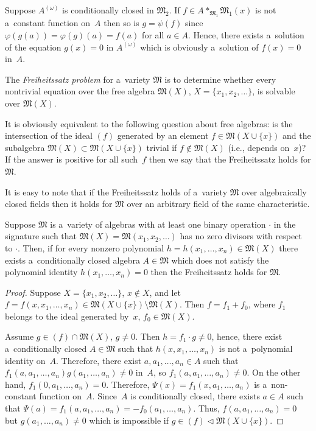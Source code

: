 \documentclass[pdftex]{sigma}
\begin{document}
Suppose $A^{(\omega)}$ is conditionally closed in $\mathfrak M_2$.
If $f \in A*_{\mathfrak M_1} \mathfrak M_1(x)$ is not a~constant function on~$A$ then so is $g =\psi(f)$ since
$\varphi(g(a)) = \varphi(g)(a) = f(a)$ for all $a\in A$.
Hence, there exists a~solution of the equation $g(x)=0$ in $A^{(\omega)}$ which is obviously a~solution of $f(x)=0$
in~$A$.

The {\em Freiheitssatz problem} for a~variety $\mathfrak M$ is to determine whether every nontrivial equation over the
free algebra $\mathfrak M(X)$, $X=\{x_1,x_2,\dots \}$, is solvable over $\mathfrak M(X)$.

It is obviously equivalent to the following question about free algebras: is the intersection of the ideal $(f)$
generated by an element $f\in \mathfrak M(X\cup \{x\})$ and the subalgebra $\mathfrak M(X)\subset \mathfrak M(X\cup
\{x\})$ trivial if $f \notin \mathfrak M(X)$ (i.e., depends on~$x$)? If the answer is positive for all such~$f$ then we
say that the Freiheitssatz holds for $\mathfrak M$.

It is easy to note that if the Freiheitssatz holds of a~variety $\mathfrak M$ over algebraically closed f\/ields then it
holds for $\mathfrak M$ over an arbitrary f\/ield of the same characteristic.

\begin{lemma}
\label{lem:CC-Frei}
Suppose $\mathfrak M$ is a~variety of algebras with at least one binary operation $\cdot $ in the signature such that
$\mathfrak M(X)=\mathfrak M(x_1,x_2,\dots)$ has no zero divisors with respect to $\cdot $.
Then, if for every nonzero polynomial $h=h(x_1,\dots, x_n)\in \mathfrak M(X)$ there exists a~conditionally closed
algebra $A\in \mathfrak M$ which does not satisfy the polynomial identity $h(x_1,\dots, x_n) = 0$ then the Freiheitssatz
holds for $\mathfrak M$.
\end{lemma}

\begin{proof}
Suppose $X=\{x_1,x_2,\dots \}$, $x\notin X$, and let $f=f(x, x_1,\dots, x_n)\in \mathfrak M(X\cup\{x\})\setminus{\mathfrak M}(X)$.
Then $f=f_1 + f_0$, where $f_1$ belongs to the ideal generated by~$x$, $f_0\in {\mathfrak M}(X)$.

Assume $g\in (f)\cap {\mathfrak M}(X)$, $g\ne 0$.
Then $h=f_1 \cdot g \ne 0$, hence, there exist a~conditionally closed $A\in \mathfrak M$ such that $h(x,x_1,\dots, x_n)$
is not a~polynomial identity on~$A$.
Therefore, there exist $a,a_1,\dots, a_n\in A$ such that $f_1(a, a_1,\dots, a_n) g(a_1,\dots, a_n)\ne 0 $ in~$A$, so
\mbox{$f_1(a, a_1,\dots, a_n)\ne 0$}.
On the other hand, $f_1(0,a_1,\dots, a_n)=0$.
Therefore, $\Psi(x) = f_1(x, a_1,\dots, a_n)$ is a~non-constant function on~$A$.
Since~$A$ is conditionally closed, there exists $a\in A$ such that $\Psi(a) = f_1(a, a_1,\dots, a_n) = -f_0(a_1,\dots,
a_n)$.
Thus, $f(a,a_1,\dots, a_n)=0$ but $g(a_1,\dots, a_n)\ne 0$ which is impossible if $g\in (f)\triangleleft \mathfrak
M(X\cup\{x\})$.
\end{proof}
\end{document}
